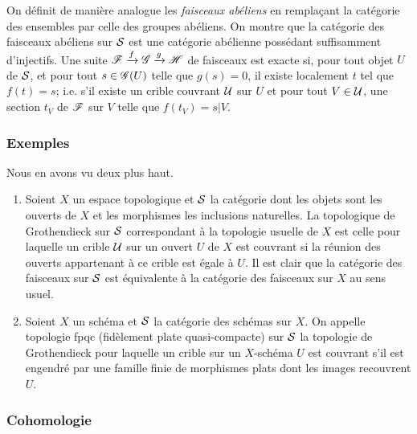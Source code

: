 \documentclass[oneside]{book}
\begin{document}
On définit de manière analogue les \emph{faisceaux abéliens} en 
remplaçant la catégorie des ensembles par celle des groupes abéliens. On 
montre que la catégorie des faisceaux abéliens sur $\mathcal{S}$ est une 
catégorie abélienne possédant suffisamment d'injectifs. Une suite 
$\mathscr{F}\xrightarrow f \mathscr{G}\xrightarrow g \mathscr{H}$ de faisceaux est exacte si, pour 
tout objet $U$ de $\mathcal{S}$, et pour tout $s\in \mathscr{G}(U)$ telle que $g(s)=0$, 
il existe localement $t$ tel que $f(t)=s$; i.e. s'il existe un crible couvrant 
$\mathcal{U}$ sur $U$ et pour tout $V\in\mathcal{U}$, une section $t_V$ de $\mathscr{F}$ sur $V$ telle 
que $f(t_V)=s|V$. 





\subsubsection{Exemples}\label{I:1-6-4}

Nous en avons vu deux plus haut. 

\begin{enumerate}[\indent a)]
  \item Soient $X$ un espace topologique et $\mathcal{S}$ la catégorie dont les objets 
    sont les ouverts de $X$ et les morphismes les inclusions naturelles. La 
    topologique de Grothendieck sur $\mathcal{S}$ correspondant à la topologie usuelle 
    de $X$ est celle pour laquelle un crible $\mathcal{U}$ sur un ouvert $U$ de $X$ est 
    couvrant si la réunion des ouverts appartenant à ce crible est égale à 
    $U$. Il est clair que la catégorie des faisceaux sur $\mathcal{S}$ est équivalente 
    à la catégorie des faisceaux sur $X$ au sens usuel. 
  \item Soient $X$ un schéma et $\mathcal{S}$ la catégorie des schémas sur $X$. On 
    appelle topologie fpqc (fidèlement plate quasi-compacte) sur $\mathcal{S}$ la 
    topologie de Grothendieck pour laquelle un crible sur un $X$-schéma $U$ est 
    couvrant s'il est engendré par une famille finie de morphismes plats dont  
    les images recouvrent $U$. 
\end{enumerate}





\subsubsection{Cohomologie}\label{I:1-6-5}
\end{document}

